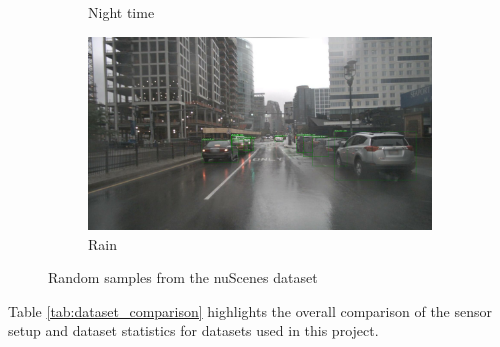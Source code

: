 \documentclass[report.tex]{subfiles}
\begin{document}
\begin{figure}[ht]
\begin{subfigure}{0.3\textwidth}
                \caption{Night time}
                \label{fig:sub2}
            \end{subfigure}
            \hfill
            \begin{subfigure}{0.3\textwidth}
                \centering
                \includegraphics[width=\linewidth]{images/datasets/nuscenes/samples/rain_cam.png}
                \caption{Rain}
                \label{fig:sub3}
            \end{subfigure}
        
            \caption{Random samples from the nuScenes dataset}
            \label{fig:nuscenes_samples}
        \end{figure}
        

        Table \ref{tab:dataset_comparison} highlights the overall comparison of the sensor setup and dataset statistics for datasets used in this project.
\end{document}
